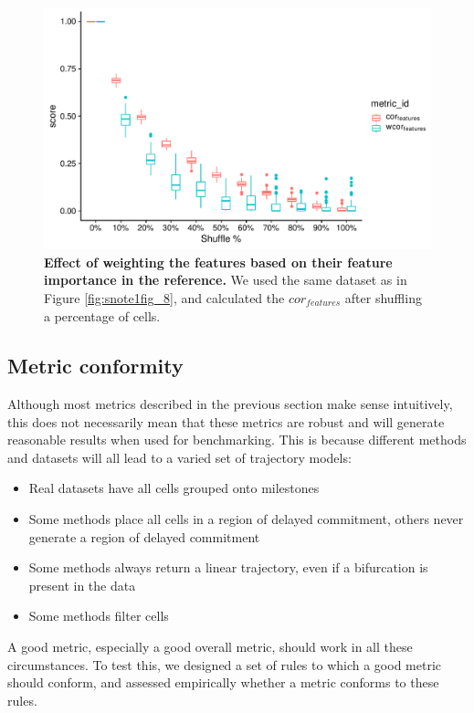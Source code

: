\begin{figure}[tbh!]
	\centering\includegraphics[width=\linewidth]{fig/snote1fig_10.pdf}
	\caption{
		\textbf{Effect of weighting the features based on their feature importance in the reference.} 
		We used the same dataset as in Figure \ref{fig:snote1fig_8}, and calculated the $\textit{cor}_{\textit{features}}$ after shuffling a percentage of cells.
	}
	\label{fig:snote1fig_10}
\end{figure}


\subsection{Metric conformity}

Although most metrics described in the previous section make sense intuitively, this does not necessarily mean that these metrics are robust and will generate reasonable results when used for benchmarking. This is because different methods and datasets will all lead to a varied set of trajectory models:

\begin{itemize}
	\item Real datasets have all cells grouped onto milestones
	\item Some methods place all cells in a region of delayed commitment, others never generate a region of delayed commitment
	\item Some methods always return a linear trajectory, even if a bifurcation is present in the data
	\item Some methods filter cells
\end{itemize}

A good metric, especially a good overall metric, should work in all these circumstances. To test this, we designed a set of rules to which a good metric should conform, and assessed empirically whether a metric conforms to these rules.

